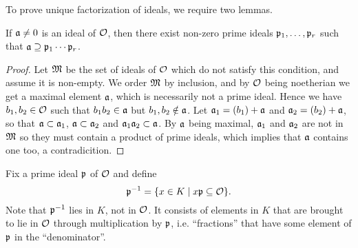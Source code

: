 To prove unique factorization of ideals, we require two lemmas.

\begin{lem}[Neukirch 3.4]
	If $\mathfrak{a}\neq 0$ is an ideal of $\mathcal{O}$, then there exist non-zero prime ideals $\mathfrak{p}_1,\dots,\mathfrak{p}_r$ such that $\mathfrak{a}\supseteq\mathfrak{p}_1\cdots\mathfrak{p}_r$.
\end{lem}
\begin{proof}
	Let $\mathfrak{M}$ be the set of ideals of $\mathcal{O}$ which do not satisfy this condition, and assume it is non-empty. We order $\mathfrak{M}$ by inclusion, and by $\mathcal{O}$ being noetherian we get a maximal element $\mathfrak{a}$, which is necessarily not a prime ideal. Hence we have $b_1,b_2\in\mathcal{O}$ such that $b_1b_2\in\mathfrak{a}$ but $b_1,b_2\notin\mathfrak{a}$. Let $\mathfrak{a}_1 = (b_1) + \mathfrak{a}$ and $\mathfrak{a}_2 = (b_2) + \mathfrak{a}$, so that $\mathfrak{a}\subset\mathfrak{a}_1$, $\mathfrak{a}\subset\mathfrak{a}_2$ and $\mathfrak{a}_1\mathfrak{a}_2\subset\mathfrak{a}$. By $\mathfrak{a}$ being maximal, $\mathfrak{a}_1$ and $\mathfrak{a}_2$ are not in $\mathfrak{M}$ so they must contain a product of prime ideals, which implies that $\mathfrak{a}$ contains one too, a contradicition.
\end{proof}

Fix a prime ideal $\mathfrak{p}$ of $\mathcal{O}$ and define
\[
	\mathfrak{p}^{-1} = \{x\in K\mid x\mathfrak{p}\subseteq\mathcal{O}\}.
\]
Note that $\mathfrak{p}^{-1}$ lies in $K$, not in $\mathcal{O}$. It consists of elements in $K$ that are brought to lie in $\mathcal{O}$ through multiplication by $\mathfrak{p}$, i.e. ``fractions'' that have some element of $\mathfrak{p}$ in the ``denominator''.

